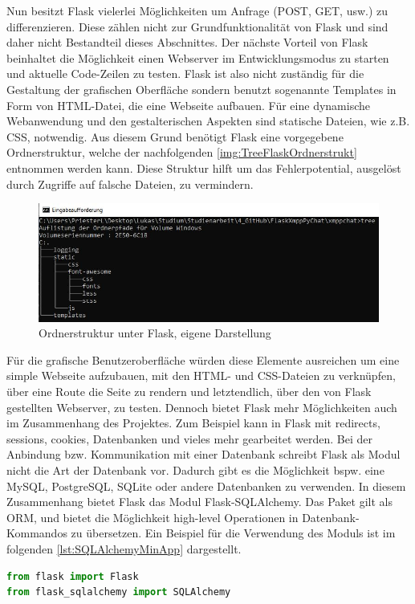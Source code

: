 \documentclass[a4paper,titlepage,halfparskip,12pt]{scrreprt}
\begin{document}
\begin{onehalfspacing}
Nun besitzt Flask vielerlei Möglichkeiten um Anfrage (POST, GET, usw.) zu differenzieren. Diese zählen nicht zur Grundfunktionalität von Flask und sind daher nicht Bestandteil dieses Abschnittes. Der nächste Vorteil von Flask beinhaltet die Möglichkeit einen Webserver im Entwicklungsmodus zu starten und aktuelle Code-Zeilen zu testen.
Flask ist also nicht zuständig für die Gestaltung der grafischen Oberfläche sondern benutzt sogenannte Templates in Form von HTML-Datei, die eine Webseite aufbauen. Für eine dynamische Webanwendung und den gestalterischen Aspekten sind statische Dateien, wie z.B. \ac{CSS}, notwendig. Aus diesem Grund benötigt Flask eine vorgegebene Ordnerstruktur, welche der nachfolgenden \autoref{img:TreeFlaskOrdnerstrukt} entnommen werden kann. Diese Struktur hilft um das Fehlerpotential, ausgelöst durch Zugriffe auf falsche Dateien, zu vermindern.
\begin{figure}[h]
	\centering
	\includegraphics[width=\textwidth]{images/TreeFlaskOrdnerstrukt}
	\caption{Ordnerstruktur unter Flask, eigene Darstellung}
	\label{img:TreeFlaskOrdnerstrukt}
\end{figure}
Für die grafische Benutzeroberfläche würden diese Elemente ausreichen um eine simple Webseite aufzubauen, mit den \ac{HTML}- und \ac{CSS}-Dateien zu verknüpfen, über eine Route die Seite zu rendern und letztendlich, über den von Flask gestellten Webserver, zu testen. Dennoch bietet Flask mehr Möglichkeiten auch im Zusammenhang des Projektes. Zum Beispiel kann in Flask mit redirects, sessions, cookies, Datenbanken und vieles mehr gearbeitet werden. Bei der Anbindung bzw. Kommunikation mit einer Datenbank schreibt Flask als Modul nicht die Art der Datenbank vor. Dadurch gibt es die Möglichkeit bspw. eine MySQL, PostgreSQL, SQLite oder andere Datenbanken zu verwenden. In diesem Zusammenhang bietet Flask das Modul Flask-SQLAlchemy. Das Paket gilt als \ac{ORM}, und bietet die Möglichkeit high-level Operationen in Datenbank-Kommandos zu übersetzen. Ein Beispiel für die Verwendung des Moduls ist im folgenden \autoref{lst:SQLAlchemyMinApp} dargestellt.
\begin{lstlisting}[language=Python,caption=Example Listing of Flask-SQLAlchemy,label={lst:SQLAlchemyMinApp}]
from flask import Flask
from flask_sqlalchemy import SQLAlchemy


\end{lstlisting}
\end{onehalfspacing}
\end{document}
